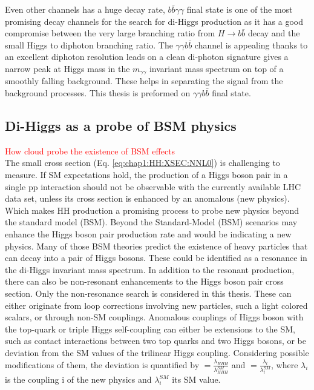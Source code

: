 Even other channels has a huge decay rate, $b\bar{b}\gamma\gamma$ final state is one of the most promising decay channels for the search for di-Higgs production as it has a good compromise between the very large branching ratio from $H\rightarrow b\bar{b}$ decay and the small Higgs to diphoton branching ratio. The $\gamma\gamma b\bar{b}$ channel is appealing thanks to an excellent diphoton resolution leads on a clean di-photon signature gives a narrow peak at Higgs mass in the $m_{\gamma\gamma}$ invariant mass spectrum
on top of a smoothly falling background. These helps in separating the signal from the background processes. This thesis is preformed on $\gamma\gamma b\bar{b}$ final state.
\subsection{Di-Higgs as a probe of BSM physics}
\label{chap1:HH:BSM}
\textcolor{red}{How \kl cloud probe the existence of BSM effects} \\
The small cross section (Eq. \ref{eq:chap1:HH:XSEC:NNL0}) is challenging to measure. If SM expectations hold, the production of a Higgs boson pair in a single pp interaction should not be observable with the currently available LHC data set, unless its cross section is enhanced by an anomalous (new physics). Which makes HH production a promising process to probe new physics beyond the standard model (BSM). Beyond the Standard-Model (BSM) scenarios may enhance the Higgs boson pair production rate and would be indicating a new physics. Many of those BSM theories predict the existence of heavy particles that can decay into a pair of Higgs bosons. These could be identified as a resonance in the di-Higgs invariant mass spectrum. In addition to the resonant production, there can also be non-resonant enhancements to the Higgs boson pair cross section. Only the non-resonance search is considered in this thesis. These can either originate from loop corrections involving new particles, such a light colored scalars, or through non-SM couplings. Anomalous couplings of Higgs boson with the top-quark or triple Higgs self-coupling can either be extensions to the SM, such as contact interactions between two top quarks and two Higgs bosons, or be deviation from the SM values of the trilinear Higgs coupling. Considering possible modifications of them, the deviation is quantified by \kl $ = \frac{\lambda_{HHH}}{\lambda_{HHH}^{SM}}$ and \kt $= \frac{\lambda_{t}}{\lambda_{t}^{SM}}$, where $\lambda_{i}$ is the coupling i of the new physics and $\lambda_{i}^{SM}$ its SM value. \\
